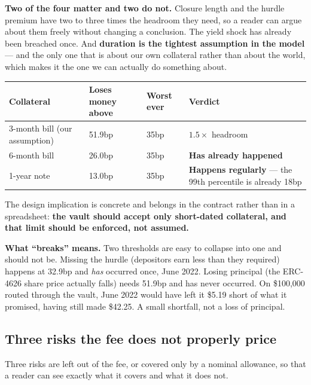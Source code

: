 \documentclass[11pt,a4paper]{article}
\newcommand{\note}[1]{{\small\color{muted}#1}}
\begin{document}
\textbf{Two of the four matter and two do not.} Closure length and the hurdle premium have two to
three times the headroom they need, so a reader can argue about them freely without changing a
conclusion. The yield shock has already been breached once. And \textbf{duration is the tightest
assumption in the model} — and the only one that is about our own collateral rather than about the
world, which makes it the one we can actually do something about.

\begin{center}
\small
\begin{tabular}{@{}p{4.0cm}p{2.1cm}p{1.6cm}p{5.6cm}@{}}
\toprule
\textbf{Collateral} & \textbf{Loses money above} & \textbf{Worst ever} & \textbf{Verdict} \\
\midrule
3-month bill (our assumption) & 51.9bp & 35bp & $1.5\times$ headroom \\
6-month bill & 26.0bp & 35bp & \textbf{Has already happened} \\
1-year note & 13.0bp & 35bp & \textbf{Happens regularly} --- the 99th percentile is already 18bp \\
\bottomrule
\end{tabular}
\end{center}

The design implication is concrete and belongs in the contract rather than in a spreadsheet:
\textbf{the vault should accept only short-dated collateral, and that limit should be enforced, not
assumed.}

\note{\textbf{What ``breaks'' means.} Two thresholds are easy to collapse into one and should not be.
Missing the hurdle (depositors earn less than they required) happens at 32.9bp and \emph{has}
occurred once, June 2022. Losing principal (the ERC-4626 share price actually falls) needs 51.9bp and
has never occurred. On \$100,000 routed through the vault, June 2022 would have left it \$5.19 short
of what it promised, having still made \$42.25. A small shortfall, not a loss of principal.}

\subsection{Three risks the fee does not properly price}\label{sec:mockgap}

Three risks are left out of the fee, or covered only by a nominal allowance, so that a reader can see
exactly what it covers and what it does not.
\end{document}
